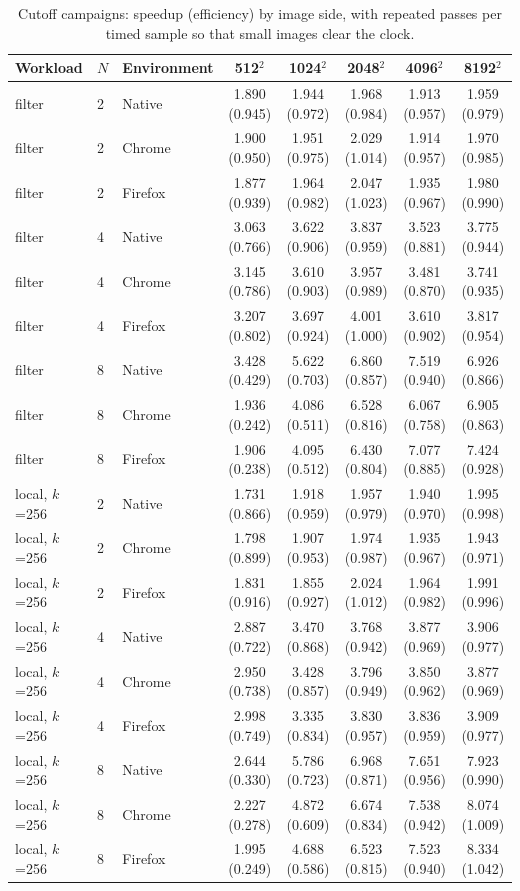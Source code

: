 \begin{table}[htbp]
\caption{Cutoff campaigns: speedup (efficiency) by image side, with repeated passes per timed sample so that small images clear the clock.}\label{tab:cutoff}
\centering\footnotesize
\begin{tabular}{lllccccc}
\toprule
Workload & $N$ & Environment & 512$^2$ & 1024$^2$ & 2048$^2$ & 4096$^2$ & 8192$^2$ \\
\midrule
filter & 2 & Native & 1.890 (0.945) & 1.944 (0.972) & 1.968 (0.984) & 1.913 (0.957) & 1.959 (0.979) \\
filter & 2 & Chrome & 1.900 (0.950) & 1.951 (0.975) & 2.029 (1.014) & 1.914 (0.957) & 1.970 (0.985) \\
filter & 2 & Firefox & 1.877 (0.939) & 1.964 (0.982) & 2.047 (1.023) & 1.935 (0.967) & 1.980 (0.990) \\
filter & 4 & Native & 3.063 (0.766) & 3.622 (0.906) & 3.837 (0.959) & 3.523 (0.881) & 3.775 (0.944) \\
filter & 4 & Chrome & 3.145 (0.786) & 3.610 (0.903) & 3.957 (0.989) & 3.481 (0.870) & 3.741 (0.935) \\
filter & 4 & Firefox & 3.207 (0.802) & 3.697 (0.924) & 4.001 (1.000) & 3.610 (0.902) & 3.817 (0.954) \\
filter & 8 & Native & 3.428 (0.429) & 5.622 (0.703) & 6.860 (0.857) & 7.519 (0.940) & 6.926 (0.866) \\
filter & 8 & Chrome & 1.936 (0.242) & 4.086 (0.511) & 6.528 (0.816) & 6.067 (0.758) & 6.905 (0.863) \\
filter & 8 & Firefox & 1.906 (0.238) & 4.095 (0.512) & 6.430 (0.804) & 7.077 (0.885) & 7.424 (0.928) \\
\midrule
local, $k$=256 & 2 & Native & 1.731 (0.866) & 1.918 (0.959) & 1.957 (0.979) & 1.940 (0.970) & 1.995 (0.998) \\
local, $k$=256 & 2 & Chrome & 1.798 (0.899) & 1.907 (0.953) & 1.974 (0.987) & 1.935 (0.967) & 1.943 (0.971) \\
local, $k$=256 & 2 & Firefox & 1.831 (0.916) & 1.855 (0.927) & 2.024 (1.012) & 1.964 (0.982) & 1.991 (0.996) \\
local, $k$=256 & 4 & Native & 2.887 (0.722) & 3.470 (0.868) & 3.768 (0.942) & 3.877 (0.969) & 3.906 (0.977) \\
local, $k$=256 & 4 & Chrome & 2.950 (0.738) & 3.428 (0.857) & 3.796 (0.949) & 3.850 (0.962) & 3.877 (0.969) \\
local, $k$=256 & 4 & Firefox & 2.998 (0.749) & 3.335 (0.834) & 3.830 (0.957) & 3.836 (0.959) & 3.909 (0.977) \\
local, $k$=256 & 8 & Native & 2.644 (0.330) & 5.786 (0.723) & 6.968 (0.871) & 7.651 (0.956) & 7.923 (0.990) \\
local, $k$=256 & 8 & Chrome & 2.227 (0.278) & 4.872 (0.609) & 6.674 (0.834) & 7.538 (0.942) & 8.074 (1.009) \\
local, $k$=256 & 8 & Firefox & 1.995 (0.249) & 4.688 (0.586) & 6.523 (0.815) & 7.523 (0.940) & 8.334 (1.042) \\
\bottomrule
\end{tabular}
\end{table}
